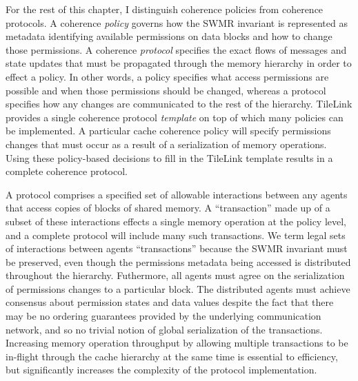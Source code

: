 For the rest of this chapter, I distinguish coherence policies from coherence protocols.
A coherence {\em policy} governs how the SWMR invariant is represented as metadata identifying available permissions on data blocks and how to change those permissions.
A coherence {\em protocol} specifies the exact flows of messages and state updates that must be propagated through the memory hierarchy in order to effect a policy.
In other words, a policy specifies what access permissions are possible and when those permissions should be changed,
whereas a protocol specifies how any changes are communicated to the rest of the hierarchy.
TileLink provides a single coherence protocol {\em template} on top of which many policies can be implemented.
A particular cache coherence policy will specify permissions changes that must occur as a result of a serialization of memory operations.
Using these policy-based decisions to fill in the TileLink template results in a complete coherence protocol.

A protocol comprises a specified set of allowable interactions between any agents that access copies of blocks of shared memory.
A ``transaction'' made up of a subset of these interactions effects a single memory operation at the policy level,
and a complete protocol will include many such transactions.
We term legal sets of interactions between agents ``transactions'' because the SWMR invariant must be preserved,
even though the permissions metadata being accessed is distributed throughout the hierarchy.
Futhermore, all agents must agree on the serialization of permissions changes to a particular block.
The distributed agents must achieve consensus about permission states and data values
despite the fact that there may be no ordering guarantees
provided by the underlying communication network, and so no trivial notion of global serialization of the transactions.
Increasing memory operation throughput by allowing multiple transactions to be in-flight through the cache hierarchy
at the same time is essential to efficiency, but significantly increases the complexity of the protocol implementation.

